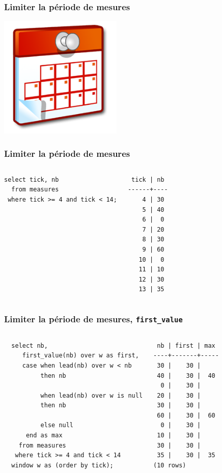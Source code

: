 \documentclass{beamer}
\begin{document}
\begin{frame}[fragile]
  \frametitle{Limiter la période de mesures}

  \begin{center}
    \includegraphics[height=2.3in]{calendar.png}
  \end{center}
\end{frame}

\begin{frame}[fragile]
  \frametitle{Limiter la période de mesures}

\begin{columns}
\begin{verbatim}
select tick, nb
  from measures
 where tick >= 4 and tick < 14;
\end{verbatim}

\begin{verbatim}
 tick | nb 
------+----
    4 | 30
    5 | 40
    6 |  0
    7 | 20
    8 | 30
    9 | 60
   10 |  0
   11 | 10
   12 | 30
   13 | 35
\end{verbatim}
\end{columns}
\end{frame}

\begin{frame}[fragile]
  \frametitle{Limiter la période de mesures, \texttt{first\_value}}

\begin{columns}
\begin{verbatim}
  select nb,
     first_value(nb) over w as first,
     case when lead(nb) over w < nb
          then nb

          when lead(nb) over w is null
          then nb

          else null
      end as max
    from measures
   where tick >= 4 and tick < 14
  window w as (order by tick);
\end{verbatim}

\begin{verbatim}
 nb | first | max 
----+-------+-----
 30 |    30 |    
 40 |    30 |  40
  0 |    30 |    
 20 |    30 |    
 30 |    30 |    
 60 |    30 |  60
  0 |    30 |    
 10 |    30 |    
 30 |    30 |    
 35 |    30 |  35
(10 rows)
\end{verbatim}
\end{columns}
\end{frame}
\end{document}

